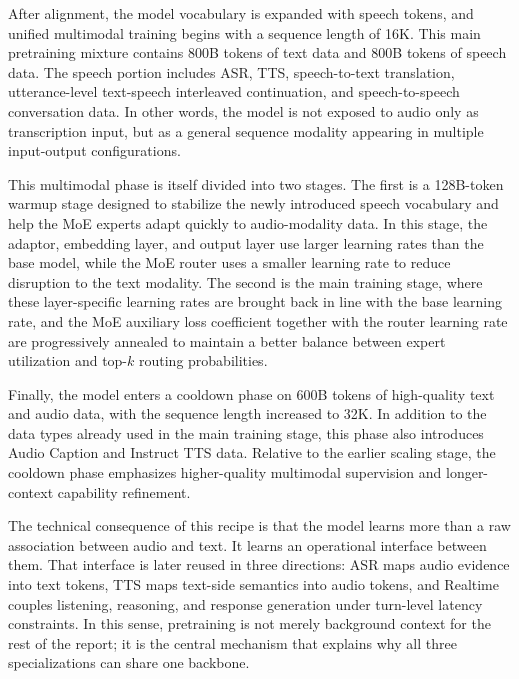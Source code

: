 After alignment, the model vocabulary is expanded with speech tokens, and unified multimodal training begins with a sequence length of 16K. This main pretraining mixture contains 800B tokens of text data and 800B tokens of speech data. The speech portion includes ASR, TTS, speech-to-text translation, utterance-level text-speech interleaved continuation, and speech-to-speech conversation data. In other words, the model is not exposed to audio only as transcription input, but as a general sequence modality appearing in multiple input-output configurations.

This multimodal phase is itself divided into two stages. The first is a 128B-token warmup stage designed to stabilize the newly introduced speech vocabulary and help the MoE experts adapt quickly to audio-modality data. In this stage, the adaptor, embedding layer, and output layer use larger learning rates than the base model, while the MoE router uses a smaller learning rate to reduce disruption to the text modality. The second is the main training stage, where these layer-specific learning rates are brought back in line with the base learning rate, and the MoE auxiliary loss coefficient together with the router learning rate are progressively annealed to maintain a better balance between expert utilization and top-$k$ routing probabilities.

Finally, the model enters a cooldown phase on 600B tokens of high-quality text and audio data, with the sequence length increased to 32K. In addition to the data types already used in the main training stage, this phase also introduces Audio Caption and Instruct TTS data. Relative to the earlier scaling stage, the cooldown phase emphasizes higher-quality multimodal supervision and longer-context capability refinement.

The technical consequence of this recipe is that the model learns more than a raw association between audio and text. It learns an operational interface between them. That interface is later reused in three directions: ASR maps audio evidence into text tokens, TTS maps text-side semantics into audio tokens, and Realtime couples listening, reasoning, and response generation under turn-level latency constraints. In this sense, pretraining is not merely background context for the rest of the report; it is the central mechanism that explains why all three specializations can share one backbone.


